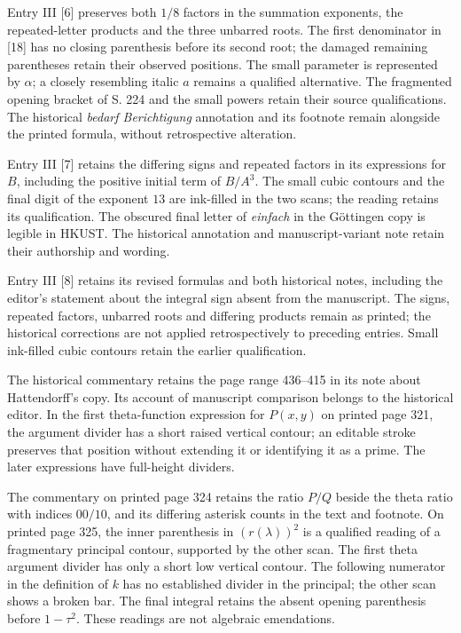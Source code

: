 Entry III [6] preserves both $1/8$ factors in the summation exponents, the repeated-letter products and the three unbarred roots. The first denominator in [18] has no closing parenthesis before its second root; the damaged remaining parentheses retain their observed positions. The small parameter is represented by $\alpha$; a closely resembling italic $a$ remains a qualified alternative. The fragmented opening bracket of S. 224 and the small powers retain their source qualifications. The historical \textit{bedarf Berichtigung} annotation and its footnote remain alongside the printed formula, without retrospective alteration.

Entry III [7] retains the differing signs and repeated factors in its expressions for $B$, including the positive initial term of $B/A^3$. The small cubic contours and the final digit of the exponent $13$ are ink-filled in the two scans; the reading retains its qualification. The obscured final letter of \textit{einfach} in the Göttingen copy is legible in HKUST. The historical annotation and manuscript-variant note retain their authorship and wording.

Entry III [8] retains its revised formulas and both historical notes, including the editor’s statement about the integral sign absent from the manuscript. The signs, repeated factors, unbarred roots and differing products remain as printed; the historical corrections are not applied retrospectively to preceding entries. Small ink-filled cubic contours retain the earlier qualification.

The historical commentary retains the page range 436--415 in its note about Hattendorff’s copy. Its account of manuscript comparison belongs to the historical editor. In the first theta-function expression for $P(x,y)$ on printed page 321, the argument divider has a short raised vertical contour; an editable stroke preserves that position without extending it or identifying it as a prime. The later expressions have full-height dividers.

The commentary on printed page 324 retains the ratio $P/Q$ beside the theta ratio with indices $00/10$, and its differing asterisk counts in the text and footnote. On printed page 325, the inner parenthesis in $(r(\lambda))^2$ is a qualified reading of a fragmentary principal contour, supported by the other scan. The first theta argument divider has only a short low vertical contour. The following numerator in the definition of $k$ has no established divider in the principal; the other scan shows a broken bar. The final integral retains the absent opening parenthesis before $1-\tau^2$. These readings are not algebraic emendations.

